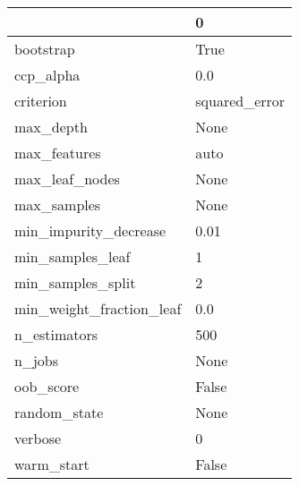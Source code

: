 \begin{tabular}{ll}
\toprule
{} &              0 \\
\midrule
bootstrap                &           True \\
ccp\_alpha                &            0.0 \\
criterion                &  squared\_error \\
max\_depth                &           None \\
max\_features             &           auto \\
max\_leaf\_nodes           &           None \\
max\_samples              &           None \\
min\_impurity\_decrease    &           0.01 \\
min\_samples\_leaf         &              1 \\
min\_samples\_split        &              2 \\
min\_weight\_fraction\_leaf &            0.0 \\
n\_estimators             &            500 \\
n\_jobs                   &           None \\
oob\_score                &          False \\
random\_state             &           None \\
verbose                  &              0 \\
warm\_start               &          False \\
\bottomrule
\end{tabular}
